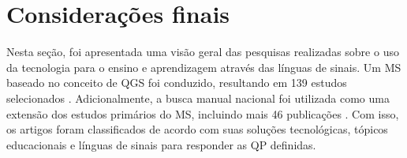 



\section{Considerações finais}
\label{ms:fim}

Nesta seção, foi apresentada uma visão geral das pesquisas realizadas sobre o uso da tecnologia para o ensino e aprendizagem através das línguas de sinais. Um MS baseado no conceito de QGS foi conduzido, resultando em 139 estudos selecionados \cite{FalvoJr2020_FIE}. Adicionalmente, a busca manual nacional foi utilizada como uma extensão dos estudos primários do MS, incluindo mais 46 publicações \cite{FalvoJr2020_SBIE}. Com isso, os artigos foram classificados de acordo com suas soluções tecnológicas, tópicos educacionais e línguas de sinais para responder as QP definidas. 

